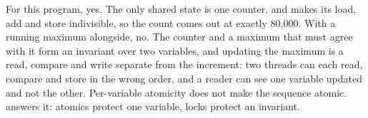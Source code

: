  For this program, yes. The only shared state is one counter, and  makes
its load, add and store indivisible, so the count comes out at exactly 80,000. With a running
maximum alongside, no. The counter and a maximum that must agree with it form an invariant over two
variables, and updating the maximum is a read, compare and write separate from the increment: two
threads can each read, compare and store in the wrong order, and a reader can see one variable
updated and not the other. Per-variable atomicity does not make the sequence atomic.
 answers it: atomics protect one variable, locks protect an invariant.
